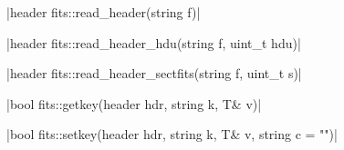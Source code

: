 \item \cppinline|header fits::read_header(string f)| 

\cppinline|header fits::read_header_hdu(string f, uint_t hdu)|

\cppinline|header fits::read_header_sectfits(string f, uint_t s)|

\item \cppinline|bool fits::getkey(header hdr, string k, T& v)| 

\item \cppinline|bool fits::setkey(header hdr, string k, T& v, string c = "")| 
